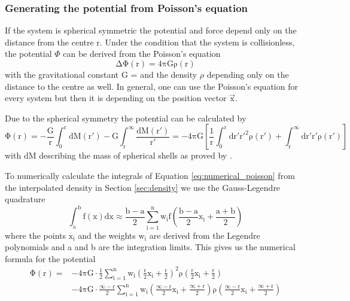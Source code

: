 \subsubsection{Generating the potential from Poisson's equation}\label{sec:poisson}
If the system is spherical symmetric the potential and force depend only on the distance from the centre r. Under the condition that the system is collisionless, the potential \(\Phi\) can be derived from the Poisson's equation \begin{equation}\label{eq:Poisson}
\mathrm{\Delta\Phi(r)=4\pi G \rho(r)}
\end{equation}
with the gravitational constant G =  \citep{2015arXiv150707956M} and the density \(\rho\) depending only on the distance to the centre as well. In general, one can use the Poisson's equation for every system but then it is depending on the position vector \(\vec{\mathrm{x}}\). 
\par Due to the spherical symmetry the potential can be calculated by 
\begin{equation}\label{eq:numerical_poisson}
\mathrm{\Phi(r)=-\frac{G}{r}\int_0^r{\mathrm{d}M(r')}-G\int_r^{\infty}{\frac{\mathrm{d}M(r')}{r'}}=-4\pi G\left[\frac{1}{r}\int_0^r\mathrm{d}r'r'^2\rho(r')+\int_r^{\infty}\mathrm{d}r'r'\rho(r')\right]}
\end{equation} with dM describing the mass of spherical shells as proved by \citet[eq. 2.28]{2008gady.book.....B}. 
\par To numerically calculate the integrals of Equation \eqref{eq:numerical_poisson} from the interpolated density in Section \ref{sec:density} we use the Gauss-Legendre quadrature 
\begin{equation}\label{eq:Gauss-Legendre}
\mathrm{\int_a^b f(x)dx \approx \frac{b-a}{2}\sum_{i=1}^n w_i f\left(\frac{b-a}{2}x_i+\frac{a+b}{2}\right)}
\end{equation} where the points \(\mathrm{x_i}\) and the weights \(\mathrm{w_i}\) are derived from the Legendre polynomials and a and b are the integration limits. This gives us the numerical formula for the potential 
\begin{equation}\label{eq:numerical_potential}
\begin{aligned}
\mathrm{\Phi(r)= }& \mathrm{-4\pi G \cdot \frac{1}{2}\sum_{i=1}^n  w_i\left(\frac{r}{2}x_i+\frac{r}{2}\right)^2\rho\left(\frac{r}{2} x_i+ \frac{r}{2}\right) }\\
& \mathrm{-4\pi G\cdot\frac{\infty-r}{2}\sum_{i=1}^n w_i\left(\frac{\infty-r}{2} x_i +\frac{\infty+r}{2}\right)\rho\left(\frac{\infty-r}{2} x_i +\frac{\infty+r}{2}\right)}
\end{aligned}
\end{equation}
